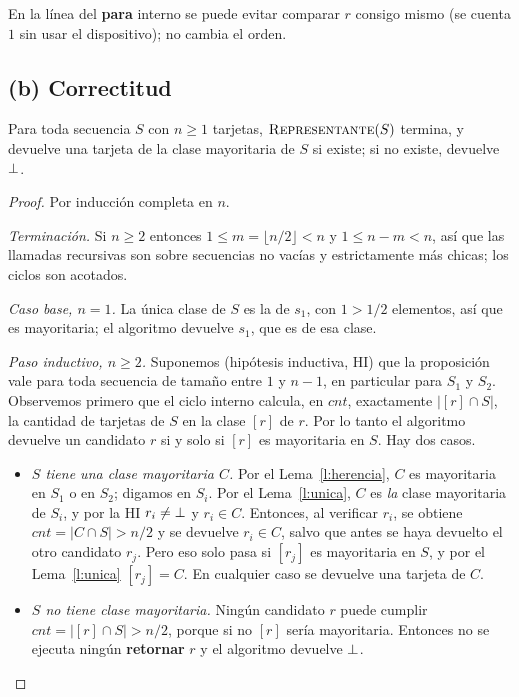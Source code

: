 En la línea del \textbf{para} interno se puede evitar comparar $r$ consigo mismo (se
cuenta $1$ sin usar el dispositivo); no cambia el orden.

\subsection*{(b) Correctitud}

\begin{proposicion}
Para toda secuencia $S$ con $n\ge1$ tarjetas, $\textsc{Representante}(S)$ termina, y
devuelve una tarjeta de la clase mayoritaria de $S$ si existe; si no existe, devuelve
$\bot$.
\end{proposicion}
\begin{proof}
Por inducción completa en $n$.

\emph{Terminación.} Si $n\ge 2$ entonces $1\le m=\lfloor n/2\rfloor<n$ y
$1\le n-m<n$, así que las llamadas recursivas son sobre secuencias no vacías y
estrictamente más chicas; los ciclos son acotados.

\emph{Caso base, $n=1$.} La única clase de $S$ es la de $s_1$, con $1>1/2$ elementos, así
que es mayoritaria; el algoritmo devuelve $s_1$, que es de esa clase.

\emph{Paso inductivo, $n\ge2$.} Suponemos (hipótesis inductiva, HI) que la proposición
vale para toda secuencia de tamaño entre $1$ y $n-1$, en particular para $S_1$ y $S_2$.
Observemos primero que el ciclo interno calcula, en $cnt$, exactamente
$|[r]\cap S|$, la cantidad de tarjetas de $S$ en la clase $[r]$ de $r$. Por lo tanto el
algoritmo devuelve un candidato $r$ si y solo si $[r]$ es mayoritaria en $S$. Hay dos
casos.

\begin{itemize}
\item \emph{$S$ tiene una clase mayoritaria $C$.} Por el Lema~\ref{l:herencia}, $C$ es
mayoritaria en $S_1$ o en $S_2$; digamos en $S_i$. Por el Lema~\ref{l:unica}, $C$ es
\emph{la} clase mayoritaria de $S_i$, y por la HI $r_i\neq\bot$ y $r_i\in C$. Entonces, al
verificar $r_i$, se obtiene $cnt=|C\cap S|>n/2$ y se devuelve $r_i\in C$, salvo que antes
se haya devuelto el otro candidato $r_j$. Pero eso solo pasa si $[r_j]$ es mayoritaria en
$S$, y por el Lema~\ref{l:unica} $[r_j]=C$. En cualquier caso se devuelve una tarjeta de
$C$.
\item \emph{$S$ no tiene clase mayoritaria.} Ningún candidato $r$ puede cumplir
$cnt=|[r]\cap S|>n/2$, porque si no $[r]$ sería mayoritaria. Entonces no se ejecuta
ningún \textbf{retornar} $r$ y el algoritmo devuelve $\bot$. \qedhere
\end{itemize}
\end{proof}

